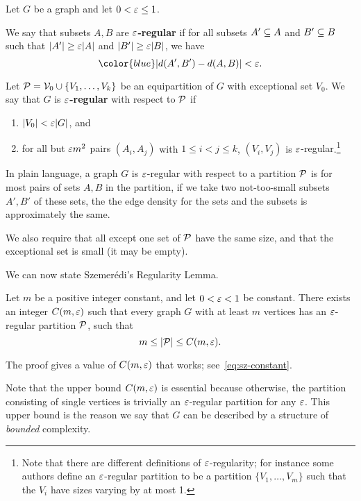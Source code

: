 \begin{df}
Let $G$ be a graph and let $0<\ep\le1$.

We say that subsets $A,B$ are \textbf{$\ep$-regular} if
for all subsets $A'\subeq A$ and $B'\subeq B$ such that {\color{green}$|A'|\ge \ep|A|$ and $|B'|\ge \ep |B|$}, we have 
\[
\color{blue}|d(A',B')-d(A,B)|< \ep.
\]

Let $\cal P=\cal V_0\cup \{V_1,\ldots,V_k\}$ be an equipartition of $G$ with exceptional set $V_0$.
We say that $G$ is \textbf{$\ep$-regular} with respect to $\cal P$ if %
\begin{enumerate}
\item
$|V_0|<\ep|G|$, and 
\item
{\color{purple} for all but $\ep m^2$ pairs} $(A_i,A_j)$ with $1\le i<j\le k$, $(V_i,V_j)$ is {$\ep$-regular}.\footnote{Note that there are different definitions of $\ep$-regularity; for instance some authors define an $\ep$-regular partition to be a partition $\{V_1,\ldots, V_m\}$ such that the $V_i$ have sizes varying by at most 1.}
\end{enumerate}
\end{df}
In plain language, a graph $G$ is $\ep$-regular with respect to a partition $\cal P$ is for {\color{purple} most pairs of sets $A,B$ in the partition}, if {\color{green}we take two not-too-small subsets $A',B'$ of these sets}, the {\color{blue} the edge density for the sets and the subsets is approximately the same}.

We also require that all except one set of $\cal P$ have the same size, and that the exceptional set is small (it may be empty).

We can now state Szemer\'edi's Regularity Lemma.
\begin{thm}
Let $m$ be a positive integer constant, and let $0<\ep<1$ be constant. There exists an integer $C(m,\ep)$ such that every graph $G$ with at least $m$ vertices has an $\ep$-regular partition $\cal P$, such that 
\[
m\le |\cal P| \le C(m,\ep).
\]
\end{thm}
\begin{rem}
The proof gives a value of $C(m,\ep)$ that works; see~\eqref{eq:sz-constant}.
\end{rem}
Note that the upper bound $C(m,\ep)$ is essential because otherwise, the partition consisting of single vertices is trivially an $\ep$-regular partition for any $\ep$. This upper bound is the reason we say that $G$ can be described by a structure of {\it bounded} complexity.

